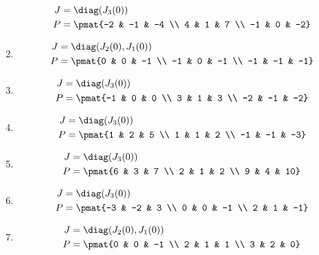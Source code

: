 \begin{enumerate}
\begin{align*}
J &= \diag(J_{3}(0))\\
P &= \pmat{-2 & -1 & -4 \\ 4 & 1 & 7 \\ -1 & 0 & -2}
\end{align*}

\item

\begin{align*}
J &= \diag(J_{2}(0), J_{1}(0))\\
P &= \pmat{0 & 0 & -1 \\ -1 & 0 & -1 \\ -1 & -1 & -1}
\end{align*}

\item

\begin{align*}
J &= \diag(J_{3}(0))\\
P &= \pmat{-1 & 0 & 0 \\ 3 & 1 & 3 \\ -2 & -1 & -2}
\end{align*}

\item

\begin{align*}
J &= \diag(J_{3}(0))\\
P &= \pmat{1 & 2 & 5 \\ 1 & 1 & 2 \\ -1 & -1 & -3}
\end{align*}

\item

\begin{align*}
J &= \diag(J_{3}(0))\\
P &= \pmat{6 & 3 & 7 \\ 2 & 1 & 2 \\ 9 & 4 & 10}
\end{align*}

\item

\begin{align*}
J &= \diag(J_{3}(0))\\
P &= \pmat{-3 & -2 & 3 \\ 0 & 0 & -1 \\ 2 & 1 & -1}
\end{align*}

\item

\begin{align*}
J &= \diag(J_{2}(0), J_{1}(0))\\
P &= \pmat{0 & 0 & -1 \\ 2 & 1 & 1 \\ 3 & 2 & 0}
\end{align*}


\end{enumerate}
